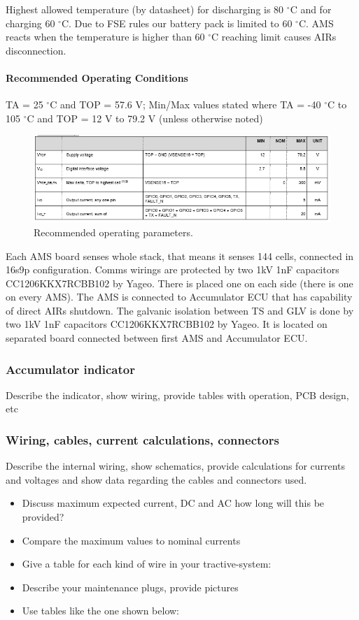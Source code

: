 Highest allowed temperature (by datasheet) for discharging is 80 $^\circ$C and for charging 60 $^\circ$C. Due to FSE rules our battery pack is limited to 60 $^\circ$C. AMS reacts when the temperature is higher than 60 $^\circ$C reaching limit causes AIRs disconnection.

\paragraph{Recommended Operating Conditions}
TA = 25 $^\circ$C and TOP = 57.6 V; Min/Max values stated where TA = -40 $^\circ$C to 105 $^\circ$C and TOP = 12 V to 79.2 V (unless otherwise noted)
\begin{figure}[H]
	\centering
	\includegraphics[width=\textwidth]{./img/BMS-operatingparms.png}
	\caption{Recommended operating parameters.}
	\label{fig:BMS-op-params}
\end{figure}


Each AMS board senses whole stack, that means it senses 144 cells, connected in 16s9p configuration. Comms wirings are protected by two 1kV 1nF capacitors CC1206KKX7RCBB102 by Yageo. There is placed one on each side (there is one on every AMS). The AMS is connected to Accumulator ECU that has capability of direct AIRs shutdown. The galvanic isolation between TS and GLV is done by two 1kV 1nF capacitors CC1206KKX7RCBB102 by Yageo. It is located on separated board connected between first AMS and Accumulator ECU.




\subsubsection{Accumulator indicator}
Describe the indicator, show wiring, provide tables with operation, PCB design, etc

\subsubsection{Wiring, cables, current calculations, connectors}
Describe the internal wiring, show schematics, provide calculations for currents and voltages and show data regarding the cables and connectors used.
\begin{itemize}
	\item 	Discuss maximum expected current, DC and AC how long will this be provided?
	\item Compare the maximum values to nominal currents
	\item Give a table for each kind of wire in your tractive-system:
	\item Describe your maintenance plugs, provide pictures
	\item Use tables like the one shown below:
\end{itemize}


